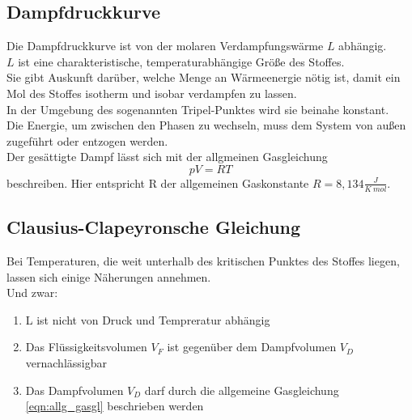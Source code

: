 \subsection{Dampfdruckkurve}
\label{subsec:Dampfdruckkurve}
Die Dampfdruckkurve ist von der molaren Verdampfungswärme $L$ abhängig.\\
$L$ ist eine charakteristische, temperaturabhängige Größe des Stoffes.\\
Sie gibt Auskunft darüber, welche Menge an Wärmeenergie nötig ist, damit 
ein Mol des Stoffes isotherm und isobar verdampfen zu lassen. \\
In der Umgebung des sogenannten Tripel-Punktes wird sie beinahe konstant. \\  
Die Energie, um zwischen den Phasen zu wechseln, muss dem System von außen zugeführt oder 
entzogen werden.\\
Der gesättigte Dampf lässt sich mit der allgmeinen Gasgleichung
\begin{equation}
    pV = RT
\label{eqn:allg_gasgl}
\end{equation}
beschreiben. Hier entspricht R der allgemeinen Gaskonstante $R = 8,134 \frac{J}{K\:mol}$. \\


\subsection{Clausius-Clapeyronsche Gleichung}
\label{subsec:Clausius-Clapeyron}
Bei Temperaturen, die weit unterhalb des kritischen Punktes des Stoffes liegen,
lassen sich einige Näherungen annehmen. \\
Und zwar:

\begin{enumerate}
    \item L ist nicht von Druck und Tempreratur abhängig
    \item Das Flüssigkeitsvolumen $V_F$ ist gegenüber dem Dampfvolumen $V_D$ vernachlässigbar
    \item Das Dampfvolumen $V_D$ darf durch die allgemeine Gasgleichung \autoref{eqn:allg_gasgl} beschrieben werden
\end{enumerate}